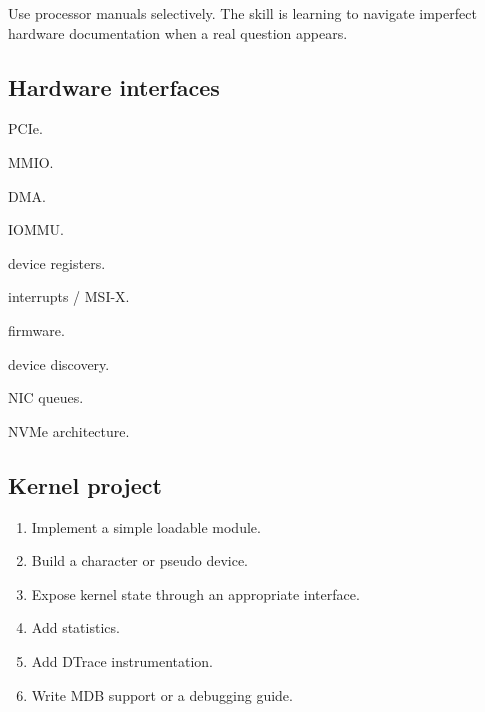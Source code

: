 \documentclass[11pt,letterpaper]{article}
\begin{document}
Use processor manuals selectively. The skill is learning to navigate imperfect hardware documentation when a real question appears.

\subsection*{Hardware interfaces}

\begin{topics}

\item PCIe.

\item MMIO.

\item DMA.

\item IOMMU.

\item device registers.

\item interrupts / MSI-X.

\item firmware.

\item device discovery.

\item NIC queues.

\item NVMe architecture.

\end{topics}

\subsection*{Kernel project}

\begin{enumerate}

\item Implement a simple loadable module.

\item Build a character or pseudo device.

\item Expose kernel state through an appropriate interface.

\item Add statistics.

\item Add DTrace instrumentation.

\item Write MDB support or a debugging guide.

\end{enumerate}
\end{document}
